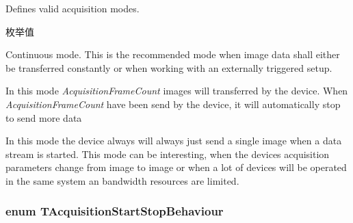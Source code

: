 Defines valid acquisition modes. 

\begin{Desc}
\item[枚举值]\par
\begin{description}
\item[{\em 
\hypertarget{group___common_interface_gga712e943ac923bb84ce2f83a57b20e6b1a5de3022fd653b96d9ac5f47e8b0c0e9b}{am\+Continuous}\label{group___common_interface_gga712e943ac923bb84ce2f83a57b20e6b1a5de3022fd653b96d9ac5f47e8b0c0e9b}
}]Continuous mode. This is the recommended mode when image data shall either be transferred constantly or when working with an externally triggered setup. \item[{\em 
\hypertarget{group___common_interface_gga712e943ac923bb84ce2f83a57b20e6b1a268f20a55d039cf7657485513e68922a}{am\+Multi\+Frame}\label{group___common_interface_gga712e943ac923bb84ce2f83a57b20e6b1a268f20a55d039cf7657485513e68922a}
}]In this mode {\itshape Acquisition\+Frame\+Count} images will transferred by the device. When {\itshape Acquisition\+Frame\+Count} have been send by the device, it will automatically stop to send more data \item[{\em 
\hypertarget{group___common_interface_gga712e943ac923bb84ce2f83a57b20e6b1a2c6590adb341529c735d75ff5c48b8ff}{am\+Single\+Frame}\label{group___common_interface_gga712e943ac923bb84ce2f83a57b20e6b1a2c6590adb341529c735d75ff5c48b8ff}
}]In this mode the device always will always just send a single image when a data stream is started. This mode can be interesting, when the devices acquisition parameters change from image to image or when a lot of devices will be operated in the same system an bandwidth resources are limited. \end{description}
\end{Desc}
\hypertarget{group___common_interface_ga5c60e3239df59a2d82b529ebc7ed13f5}{
\subsubsection[{T\+Acquisition\+Start\+Stop\+Behaviour}]{\setlength{\rightskip}{0pt plus 5cm}enum {\bf T\+Acquisition\+Start\+Stop\+Behaviour}}}\label{group___common_interface_ga5c60e3239df59a2d82b529ebc7ed13f5}


